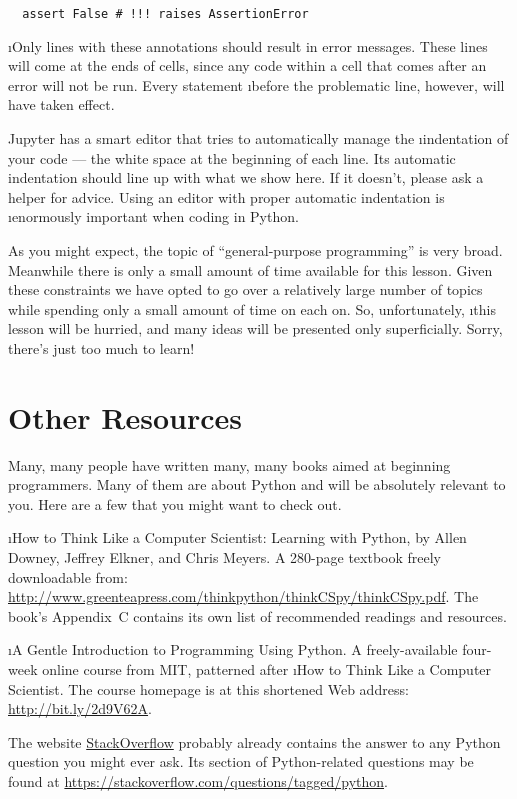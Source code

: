 \documentclass[letterpaper, 12pt, titlepage, twoside]{article}
\begin{document}
\begin{lstlisting}
  assert False # !!! raises AssertionError
\end{lstlisting}

\i{Only} lines with these annotations should result in error messages. These
lines will come at the ends of cells, since any code within a cell that comes
after an error will not be run. Every statement \i{before} the problematic
line, however, will have taken effect.

Jupyter has a smart editor that tries to automatically manage the
\i{indentation} of your code --- the white space at the beginning of each
line. Its automatic indentation should line up with what we show here. If it
doesn't, please ask a helper for advice. Using an editor with proper automatic
indentation is \i{enormously} important when coding in Python.

As you might expect, the topic of ``general-purpose programming'' is very
broad. Meanwhile there is only a small amount of time available for this
lesson. Given these constraints we have opted to go over a relatively large
number of topics while spending only a small amount of time on each on. So,
unfortunately, \i{this lesson will be hurried, and many ideas will be
  presented only superficially}. Sorry, there's just too much to learn!


\newpage
\section*{Other Resources}

Many, many people have written many, many books aimed at beginning
programmers. Many of them are about Python and will be absolutely relevant to
you. Here are a few that you might want to check out.

\i{How to Think Like a Computer Scientist: Learning with Python}, by Allen
Downey, Jeffrey Elkner, and Chris Meyers. A 280-page textbook freely
downloadable from:
\url{http://www.greenteapress.com/thinkpython/thinkCSpy/thinkCSpy.pdf}. The
book's Appendix~C contains its own list of recommended readings and resources.

\i{A Gentle Introduction to Programming Using Python}. A freely-available
four-week online course from MIT, patterned after \i{How to Think Like a
  Computer Scientist}. The course homepage is at this shortened Web address:
\url{http://bit.ly/2d9V62A}.

The website \href{https://stackoverflow.com/}{StackOverflow} probably already
contains the answer to any Python question you might ever ask. Its section of
Python-related questions may be found at
\url{https://stackoverflow.com/questions/tagged/python}.
\end{document}
